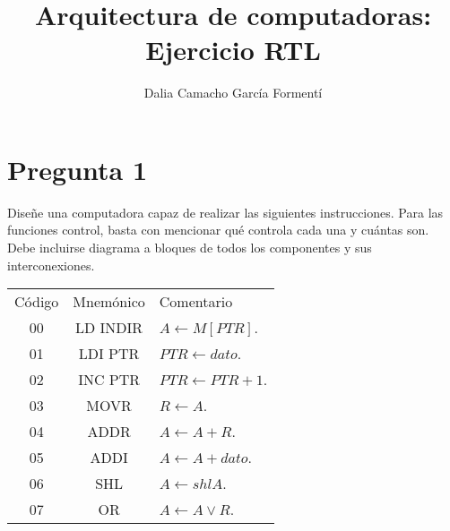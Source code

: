 \documentclass{article}
\title{Arquitectura de computadoras: Ejercicio RTL}
\author{Dalia Camacho García Formentí }
\date{}
\begin{document}
\maketitle
\section{Pregunta  1}
Diseñe una computadora capaz de realizar las siguientes instrucciones. Para las funciones control, basta con mencionar qué controla cada una y cuántas son. Debe incluirse diagrama a bloques de todos los componentes y sus interconexiones.

\begin{table}[H]
\centering 
\begin{tabular}{ccl}
Código & Mnemónico & Comentario\\
00 & LD INDIR & $A\leftarrow M[PTR]$.\\
01 & LDI PTR & $PTR\leftarrow dato $.\\
02 & INC PTR & $PTR\leftarrow PTR +1$.\\
03 & MOVR & $R\leftarrow A$.\\
04 & ADDR & $A\leftarrow A+R$.\\
05 & ADDI & $A\leftarrow A+dato$.\\
06 & SHL& $A\leftarrow shlA$.\\
07 & OR & $A\leftarrow A \lor R$.\\
\end{tabular}
\end{table}
\end{document}
